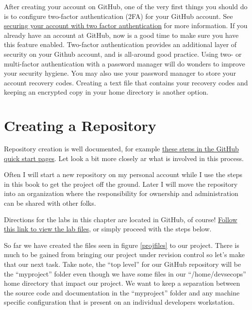 \justifying
After creating your account on GitHub, one of the very first things you should do is to configure two-factor authentication (2FA) for your GitHub account.
See \href{https://docs.github.com/en/github/authenticating-to-github/securing-your-account-with-two-factor-authentication-2fa}{securing your account with two factor authentication}
for more information. If you already have an account at GitHub, now is a good time to make sure you have this feature enabled. Two-factor authentication provides
an additional layer of security on your Github account, and is all-around good practice. Using two- or multi-factor authentication with a
password manager will do wonders
to improve your security hygiene. You may also use your password manager to store your account recovery codes. Creating a text file
that contains your recovery codes and keeping an encrypted copy in your home directory is another option.

\section{Creating a Repository}

Repository creation is well documented, for example
\href{https://docs.github.com/en/get-started/quickstart/create-a-repo}{these steps in the GitHub quick start pages}. Let look a bit
more closely ar what is involved in this process.

\justifying
Often I will start a new repository on my personal account while I use the steps in this book to get the project off the ground.
Later I will move the repository into an organization where the responsibility for ownership and administration can be
shared with other folks.

\justifying
Directions for the labs in this chapter are located in GitHub, of course!
\href{https://github.com/devsecfranklin/devsecops-tactical-workbook/tree/main/code/ch5}{Follow this link to view the lab files},
or simply proceed with the steps below.

\justifying
So far we have created the files seen in figure \ref{projfiles} to our project. There is much to be gained from bringing our project under revision control so let's
make that our next task. Take note, the ``top level'' for our GitHub repository will be the ``myproject'' folder even though we have some files in our ``/home/devsecops''
home directory that impact our project. We want to keep a separation between the source code and documentation in the ``myproject'' folder and any machine specific
configuration that is present on an individual developers workstation.

